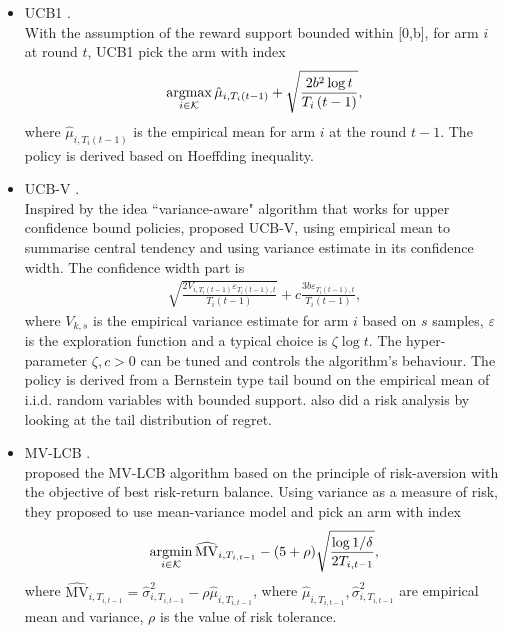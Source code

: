  \begin{itemize}
     \item UCB1 \cite{Auer2002}.\\
    With the assumption of the reward support bounded within [0,b], for arm $i$ at round $t$, UCB1 pick the arm with index
     \begin{align}
         \operatorname*{argmax}_{i \in \mathcal{K}} \hat{\mu}_{i, T_i\left(t-1\right)} + \sqrt{\frac{2b^2 \log t}{T_i\left(t-1\right)}},
     \end{align}
     where $\hat{\mu}_{i, T_i\left(t-1\right)}$ is the empirical mean for arm $i$ at the round $t-1$. The policy is derived based on Hoeffding inequality. 
     \item UCB-V \cite{audibert2009exploration}.\\
     Inspired by the idea ``variance-aware" algorithm that works for upper confidence bound policies, \textcite{audibert2009exploration} proposed UCB-V, using empirical mean to summarise central tendency and using variance estimate in its confidence width. The confidence width part is
\begin{align}
\label{policy ucbv}
    \sqrt{\frac{2 V_{i, T_{i}\left(t-1\right)} \varepsilon_{T_{i}\left(t-1\right), t}}{T_{i}\left(t-1\right)}}+c \frac{3 b \varepsilon_{T_{i}\left(t-1\right), t}}{T_{i}\left(t-1\right)},
\end{align}
where $V_{k,s}$ is the empirical variance estimate for arm $i$ based on $s$ samples, $\varepsilon$ is the exploration function and a typical choice is $\zeta \log t$. The hyper-parameter $\zeta, c >0$ can be tuned and controls the algorithm's behaviour. 
The policy is derived from a Bernstein type tail bound on the empirical mean of i.i.d. random variables with bounded support.
\textcite{audibert2009exploration} also did a risk analysis by looking at the tail distribution of regret.  

     \item MV-LCB \cite{sani_risk-aversion_2012}.\\
     \textcite{sani_risk-aversion_2012} proposed the MV-LCB algorithm based on the principle of risk-aversion with the objective of best risk-return balance. Using variance as a measure of risk, they proposed to use mean-variance model and pick an arm with index
\begin{align}
\operatorname*{argmin}_{i \in \mathcal{K}} \widehat{\mathrm{MV}}_{{i}, T_{i, t-1}}-(5+\rho) \sqrt{\frac{\log 1 / \delta}{2 T_{i, t-1}}},
\end{align}
where $\widehat{\mathrm{MV}}_{{i}, T_{i, t-1}}=\hat{\sigma}_{{i}, T_{i, t-1}}^{2}-\rho \hat{\mu}_{{i}, T_{i, t-1}}$, where $\hat{\mu}_{{i}, T_{i, t-1}}, \hat{\sigma}_{{i}, T_{i, t-1}}^{2}$ are empirical mean and variance, $\rho$ is the value of risk tolerance.


\end{itemize}
